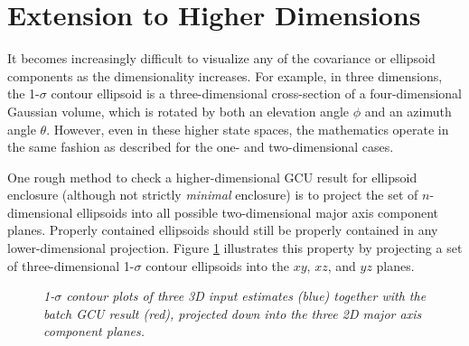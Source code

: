 \section{Extension to Higher Dimensions}


It becomes increasingly difficult to visualize any of the covariance or ellipsoid components as the dimensionality
increases. For example, in three dimensions, the 1-$\sigma$ contour ellipsoid is a three-dimensional cross-section of a
four-dimensional Gaussian volume, which is rotated by both an elevation angle $\phi$ and an azimuth angle
$\theta$. However, even in these higher state spaces, the mathematics operate in the same fashion as described for the
one- and two-dimensional cases.

One rough method to check a higher-dimensional GCU result for ellipsoid enclosure (although not strictly {\em minimal}
enclosure) is to project the set of $n$-dimensional ellipsoids into all possible two-dimensional major axis component
planes. Properly contained ellipsoids should still be properly contained in any lower-dimensional projection. Figure
\ref{fig:cu3d} illustrates this property by projecting a set of three-dimensional 1-$\sigma$ contour ellipsoids into the
$xy$, $xz$, and $yz$ planes.
\begin{figure}[tbp]
    \centering
    \caption{\it 1-$\sigma$ contour plots of three 3D input estimates (blue) together with the batch GCU result (red),
        projected down into the three 2D major axis component planes. }
    \label{fig:cu3d}
\end{figure}
